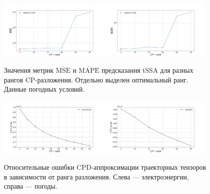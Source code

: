 	\begin{figure}[h]
		\centering
		\includegraphics[width=0.48\textwidth, keepaspectratio]{../../experiments/weather/tssa/figs/prediction/MSE_rank.png}
		\includegraphics[width=0.48\textwidth, keepaspectratio]{../../experiments/weather/tssa/figs/prediction/MAPE_rank.png}
		\caption{Значения метрик $ \overline{\text{MSE}} $ и $ \overline{\text{MAPE}} $ предсказания tSSA для разных рангов CP-разложения. Отдельно выделен оптимальный ранг. Данные погодных условий.}\label{fig:mse_mape_weather}
	\end{figure}
	
	\begin{figure}[h]
		\centering
		\includegraphics[width=0.48\textwidth, keepaspectratio]{../../experiments/electricity/tssa/figs/CPD_error.png}
		\includegraphics[width=0.48\textwidth, keepaspectratio]{../../experiments/weather/tssa/figs/CPD_error.png}
		\caption{Относительные ошибки CPD-аппроксимации траекторных тензоров в зависимости от ранга разложения. Слева --- электроэнергии, справа --- погоды.}\label{fig:cpd_errors}
	\end{figure}
	
